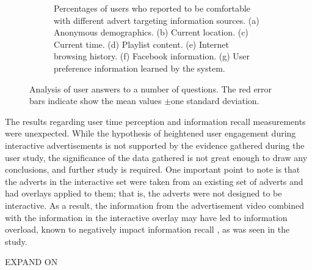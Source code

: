 \begin{figure}[h!]
\begin{subfigure}[t]{0.49\textwidth}
			\caption{Percentages of users who reported to be comfortable with different advert targeting information sources. (a) Anonymous demographics. (b) Current location. (c) Current time. (d) Playlist content. (e) Internet browsing history. (f) Facebook information. (g) User preference information learned by the system.}
		\end{subfigure}
		\caption{Analysis of user answers to a number of questions. The red error bars indicate show the mean values $\pm$one standard deviation.}
		\label{fig:qualitative_results}
	\end{figure}

	The results regarding user time perception and information recall measurements were unexpected. While the hypothesis of heightened user engagement during interactive advertisements is not supported by the evidence gathered during the user study, the significance of the data gathered is not great enough to draw any conclusions, and further study is required. One important point to note is that the adverts in the interactive set were taken from an existing set of adverts and had overlays applied to them; that is, the adverts were not designed to be interactive. As a result, the information from the advertisement video combined with the information in the interactive overlay may have led to information overload, known to negatively impact information recall \cite{divided_attention}, as was seen in the study.

	EXPAND ON \cite{divided_attention}